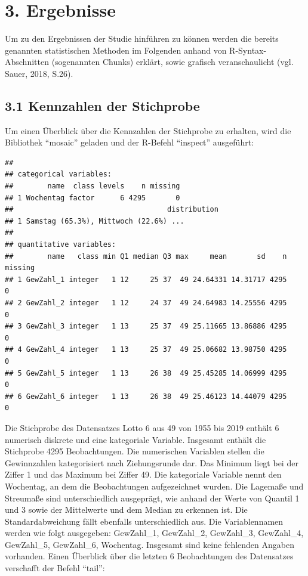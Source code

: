 \documentclass[ngerman,]{article}
\begin{document}
\section{3. Ergebnisse}\label{ergebnisse}

Um zu den Ergebnissen der Studie hinführen zu können werden die bereits
genannten statistischen Methoden im Folgenden anhand von
R-Syntax-Abschnitten (sogenannten Chunks) erklärt, sowie grafisch
veranschaulicht (vgl. Sauer, 2018, S.26).

\subsection{3.1 Kennzahlen der
Stichprobe}\label{kennzahlen-der-stichprobe}

Um einen Überblick über die Kennzahlen der Stichprobe zu erhalten, wird
die Bibliothek ``mosaic'' geladen und der R-Befehl ``inspect''
ausgeführt:

\begin{verbatim}
## 
## categorical variables:  
##        name  class levels    n missing
## 1 Wochentag factor      6 4295       0
##                                    distribution
## 1 Samstag (65.3%), Mittwoch (22.6%) ...        
## 
## quantitative variables:  
##        name   class min Q1 median Q3 max     mean       sd    n missing
## 1 GewZahl_1 integer   1 12     25 37  49 24.64331 14.31717 4295       0
## 2 GewZahl_2 integer   1 12     24 37  49 24.64983 14.25556 4295       0
## 3 GewZahl_3 integer   1 13     25 37  49 25.11665 13.86886 4295       0
## 4 GewZahl_4 integer   1 13     25 37  49 25.06682 13.98750 4295       0
## 5 GewZahl_5 integer   1 13     26 38  49 25.45285 14.06999 4295       0
## 6 GewZahl_6 integer   1 13     26 38  49 25.46123 14.44079 4295       0
\end{verbatim}

Die Stichprobe des Datensatzes Lotto 6 aus 49 von 1955 bis 2019 enthält
6 numerisch diskrete und eine kategoriale Variable. Insgesamt enthält
die Stichprobe 4295 Beobachtungen. Die numerischen Variablen stellen die
Gewinnzahlen kategorisiert nach Ziehungsrunde dar. Das Minimum liegt bei
der Ziffer 1 und das Maximum bei Ziffer 49. Die kategoriale Variable
nennt den Wochentag, an dem die Beobachtungen aufgezeichnet wurden. Die
Lagemaße und Streumaße sind unterschiedlich ausgeprägt, wie anhand der
Werte von Quantil 1 und 3 sowie der Mittelwerte und dem Median zu
erkennen ist. Die Standardabweichung fällt ebenfalls unterschiedlich
aus. Die Variablennamen werden wie folgt ausgegeben: GewZahl\_1,
GewZahl\_2, GewZahl\_3, GewZahl\_4, GewZahl\_5, GewZahl\_6, Wochentag.
Insgesamt sind keine fehlenden Angaben vorhanden. Einen Überblick über
die letzten 6 Beobachtungen des Datensatzes verschafft der Befehl
``tail'':
\end{document}
